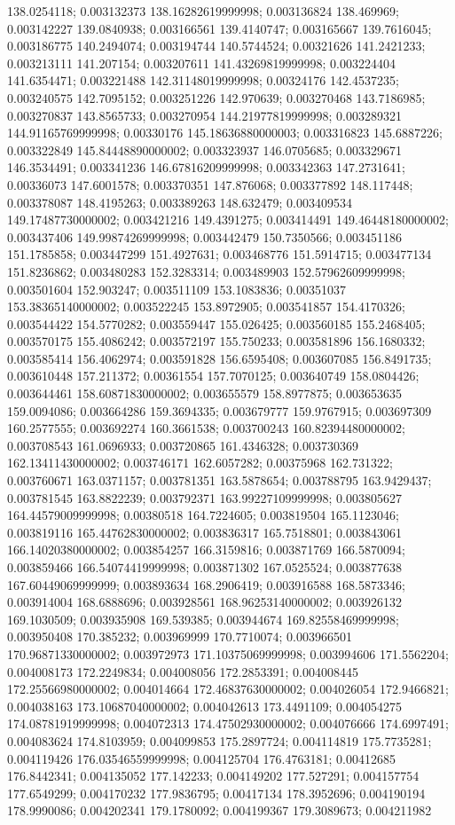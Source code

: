 138.0254118; 0.003132373 138.16282619999998; 0.003136824 138.469969; 0.003142227 139.0840938; 0.003166561 139.4140747; 0.003165667 139.7616045; 0.003186775 140.2494074; 0.003194744 140.5744524; 0.00321626 141.2421233; 0.003213111 141.207154; 0.003207611 141.43269819999998; 0.003224404 141.6354471; 0.003221488 142.31148019999998; 0.00324176 142.4537235; 0.003240575 142.7095152; 0.003251226 142.970639; 0.003270468 143.7186985; 0.003270837 143.8565733; 0.003270954 144.21977819999998; 0.003289321 144.91165769999998; 0.00330176 145.18636880000003; 0.003316823 145.6887226; 0.003322849 145.84448890000002; 0.003323937 146.0705685; 0.003329671 146.3534491; 0.003341236 146.67816209999998; 0.003342363 147.2731641; 0.00336073 147.6001578; 0.003370351 147.876068; 0.003377892 148.117448; 0.003378087 148.4195263; 0.003389263 148.632479; 0.003409534 149.17487730000002; 0.003421216 149.4391275; 0.003414491 149.46448180000002; 0.003437406 149.99874269999998; 0.003442479 150.7350566; 0.003451186 151.1785858; 0.003447299 151.4927631; 0.003468776 151.5914715; 0.003477134 151.8236862; 0.003480283 152.3283314; 0.003489903 152.57962609999998; 0.003501604 152.903247; 0.003511109 153.1083836; 0.00351037 153.38365140000002; 0.003522245 153.8972905; 0.003541857 154.4170326; 0.003544422 154.5770282; 0.003559447 155.026425; 0.003560185 155.2468405; 0.003570175 155.4086242; 0.003572197 155.750233; 0.003581896 156.1680332; 0.003585414 156.4062974; 0.003591828 156.6595408; 0.003607085 156.8491735; 0.003610448 157.211372; 0.00361554 157.7070125; 0.003640749 158.0804426; 0.003644461 158.60871830000002; 0.003655579 158.8977875; 0.003653635 159.0094086; 0.003664286 159.3694335; 0.003679777 159.9767915; 0.003697309 160.2577555; 0.003692274 160.3661538; 0.003700243 160.82394480000002; 0.003708543 161.0696933; 0.003720865 161.4346328; 0.003730369 162.13411430000002; 0.003746171 162.6057282; 0.00375968 162.731322; 0.003760671 163.0371157; 0.003781351 163.5878654; 0.003788795 163.9429437; 0.003781545 163.8822239; 0.003792371 163.99227109999998; 0.003805627 164.44579009999998; 0.00380518 164.7224605; 0.003819504 165.1123046; 0.003819116 165.44762830000002; 0.003836317 165.7518801; 0.003843061 166.14020380000002; 0.003854257 166.3159816; 0.003871769 166.5870094; 0.003859466 166.54074419999998; 0.003871302 167.0525524; 0.003877638 167.60449069999999; 0.003893634 168.2906419; 0.003916588 168.5873346; 0.003914004 168.6888696; 0.003928561 168.96253140000002; 0.003926132 169.1030509; 0.003935908 169.539385; 0.003944674 169.82558469999998; 0.003950408 170.385232; 0.003969999 170.7710074; 0.003966501 170.96871330000002; 0.003972973 171.10375069999998; 0.003994606 171.5562204; 0.004008173 172.2249834; 0.004008056 172.2853391; 0.004008445 172.25566980000002; 0.004014664 172.46837630000002; 0.004026054 172.9466821; 0.004038163 173.10687040000002; 0.004042613 173.4491109; 0.004054275 174.08781919999998; 0.004072313 174.47502930000002; 0.004076666 174.6997491; 0.004083624 174.8103959; 0.004099853 175.2897724; 0.004114819 175.7735281; 0.004119426 176.03546559999998; 0.004125704 176.4763181; 0.00412685 176.8442341; 0.004135052 177.142233; 0.004149202 177.527291; 0.004157754 177.6549299; 0.004170232 177.9836795; 0.00417134 178.3952696; 0.004190194 178.9990086; 0.004202341 179.1780092; 0.004199367 179.3089673; 0.004211982 